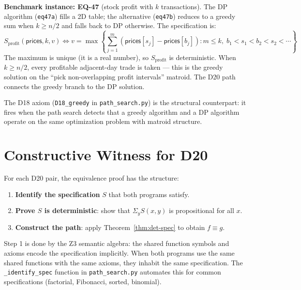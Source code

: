 \noindent\textbf{Benchmark instance: EQ-47} (stock profit with $k$
transactions).  The DP algorithm (\texttt{eq47a}) fills a 2D table;
the alternative (\texttt{eq47b}) reduces to a greedy sum when
$k \ge n/2$ and falls back to DP otherwise.  The specification is:
\[
  S_{\mathrm{profit}}(\mathsf{prices}, k, v) \iff
  v = \max\left\{\sum_{j=1}^{m}
    (\mathsf{prices}[s_j] - \mathsf{prices}[b_j])
    : m \le k,\; b_1 < s_1 < b_2 < s_2 < \cdots\right\}
\]
The maximum is unique (it is a real number), so $S_{\mathrm{profit}}$
is deterministic.  When $k \ge n/2$, every profitable adjacent-day
trade is taken --- this is the greedy solution on the ``pick
non-overlapping profit intervals'' matroid.  The D20 path connects
the greedy branch to the DP solution.

The D18 axiom (\texttt{D18\_greedy} in \texttt{path\_search.py}) is
the structural counterpart: it fires when the path search detects
that a greedy algorithm and a DP algorithm operate on the same
optimization problem with matroid structure.


\section{Constructive Witness for D20}

For each D20 pair, the equivalence proof has the structure:

\begin{enumerate}
  \item \textbf{Identify the specification} $S$ that both programs
    satisfy.
  \item \textbf{Prove $S$ is deterministic}: show that
    $\Sigma_y S(x, y)$ is propositional for all $x$.
  \item \textbf{Construct the path}: apply Theorem~\ref{thm:det-spec}
    to obtain $f \equiv g$.
\end{enumerate}

Step 1 is done by the Z3 semantic algebra: the shared function
symbols and axioms encode the specification implicitly.  When both
programs use the same shared functions with the same axioms, they
inhabit the same specification.  The \texttt{\_identify\_spec}
function in \texttt{path\_search.py} automates this for common
specifications (factorial, Fibonacci, sorted, binomial).


